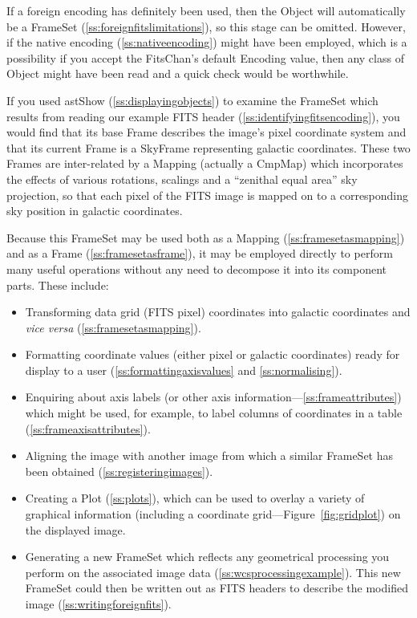 \documentclass[twoside,11pt]{article}
\newcommand{\htmlref}[2]{#1}
\newcommand{\secref}[1]{\S\ref{#1}}
\renewcommand{\secref}[1]{\ref{#1}}
\begin{document}
If a foreign encoding has definitely been used, then the Object will
automatically be a \htmlref{FrameSet}{FrameSet} (\secref{ss:foreignfitslimitations}), so
this stage can be omitted. However, if the native encoding
(\secref{ss:nativeencoding}) might have been employed, which is a
possibility if you accept the FitsChan's default \htmlref{Encoding}{Encoding} value, then
any class of Object might have been read and a quick check would be
worthwhile.

If you used \htmlref{astShow}{astShow} (\secref{ss:displayingobjects}) to examine the
FrameSet which results from reading our example FITS header
(\secref{ss:identifyingfitsencoding}), you would find that its base
\htmlref{Frame}{Frame} describes the image's pixel coordinate system and that its
current Frame is a \htmlref{SkyFrame}{SkyFrame} representing galactic coordinates. These
two Frames are inter-related by a \htmlref{Mapping}{Mapping} (actually a \htmlref{CmpMap}{CmpMap}) which
incorporates the effects of various rotations, scalings and a
``zenithal equal area'' sky projection, so that each pixel of the FITS
image is mapped on to a corresponding sky position in galactic
coordinates.

Because this FrameSet may be used both as a Mapping
(\secref{ss:framesetasmapping}) and as a Frame
(\secref{ss:framesetasframe}), it may be employed directly to perform
many useful operations without any need to decompose it into its
component parts. These include:

\begin{itemize}
\item Transforming data grid (FITS pixel) coordinates into galactic
coordinates and {\em{vice versa}} (\secref{ss:framesetasmapping}).

\item Formatting coordinate values (either pixel or galactic
coordinates) ready for display to a user
(\secref{ss:formattingaxisvalues} and \secref{ss:normalising}).

\item Enquiring about axis labels (or other axis
information---\secref{ss:frameattributes}) which might be used, for
example, to label columns of coordinates in a table
(\secref{ss:frameaxisattributes}).

\item Aligning the image with another image from which a similar
FrameSet has been obtained (\secref{ss:registeringimages}).

\item Creating a \htmlref{Plot}{Plot} (\secref{ss:plots}), which can be used to overlay
a variety of graphical information (including a coordinate
grid---Figure~\ref{fig:gridplot}) on the displayed image.

\item Generating a new FrameSet which reflects any geometrical
processing you perform on the associated image data
(\secref{ss:wcsprocessingexample}). This new FrameSet could then be
written out as FITS headers to describe the modified image
(\secref{ss:writingforeignfits}).
\end{itemize}
\end{document}
